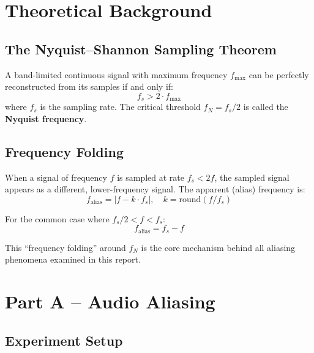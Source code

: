 \documentclass[12pt, a4paper]{article}
\begin{document}
\section{Theoretical Background}

\subsection{The Nyquist--Shannon Sampling Theorem}

A band-limited continuous signal with maximum frequency $f_{\max}$ can be perfectly reconstructed from its samples if and only if:
\begin{equation}
    f_s > 2 \cdot f_{\max}
    \label{eq:nyquist}
\end{equation}
where $f_s$ is the sampling rate. The critical threshold $f_N = f_s / 2$ is called the \textbf{Nyquist frequency}.

\subsection{Frequency Folding}

When a signal of frequency $f$ is sampled at rate $f_s < 2f$, the sampled signal appears as a different, lower-frequency signal. The apparent (alias) frequency is:
\begin{equation}
    f_{\text{alias}} = \left| f - k \cdot f_s \right|, \quad k = \text{round}(f / f_s)
    \label{eq:alias-general}
\end{equation}

For the common case where $f_s/2 < f < f_s$:
\begin{equation}
    f_{\text{alias}} = f_s - f
    \label{eq:alias-simple}
\end{equation}

This ``frequency folding'' around $f_N$ is the core mechanism behind all aliasing phenomena examined in this report.

\section{Part A -- Audio Aliasing}

\subsection{Experiment Setup}
\end{document}

